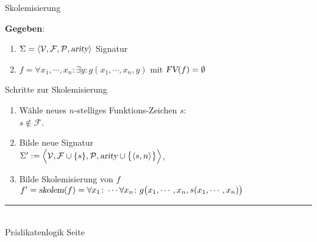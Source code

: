\documentclass{slides}
\newcommand{\myrule}{\rule{20cm}{1mm}\\ }
\def\pair(#1,#2){\langle #1, #2 \rangle}
\newcommand{\FV}{\textsl{FV}}
\newcounter{mypage}
\begin{document}

\begin{slide}{}
\normalsize
\begin{center}
Skolemisierung
\end{center}
\vspace{0.5cm}

\footnotesize
\textbf{Gegeben}:
\begin{enumerate}
\item $\Sigma = \langle \mathcal{V}, \mathcal{F}, \mathcal{P}, \textsl{arity} \rangle$ Signatur
\item $f = \forall x_1, \cdots, x_n \colon \exists y \colon g(x_1, \cdots, x_n, y)$ \quad
      mit $\FV(f) = \emptyset$    
\end{enumerate}
Schritte zur Skolemisierung
\begin{enumerate}
\item Wähle neues $n$-stelliges Funktions-Zeichen $s$: \\[0.3cm]
      \hspace*{1.3cm} $s \not\in \mathcal{F}$.
\item Bilde neue Signatur \\[0.3cm]
      \hspace*{1.3cm} 
      $\Sigma' := \Bigl\langle \mathcal{V}, \mathcal{F} \cup \{s\}, \mathcal{P}, \textsl{arity} \cup \bigl\{\pair(s,n)\bigr\} \Bigr\rangle$, 
\item Bilde Skolemisierung von $f$ \\[0.3cm]
      $f' = \textsl{skolem}(f) = \forall x_1 \colon \cdots \forall x_n \colon g\bigl(x_1, \cdots, x_n, s(x_1,\cdots,x_n)\bigr)$\\[0.1cm]
\end{enumerate}


\vspace*{\fill}
\tiny \addtocounter{mypage}{1}
\myrule
Prädikatenlogik   \hspace*{\fill} Seite 
\end{slide}
\end{document}
